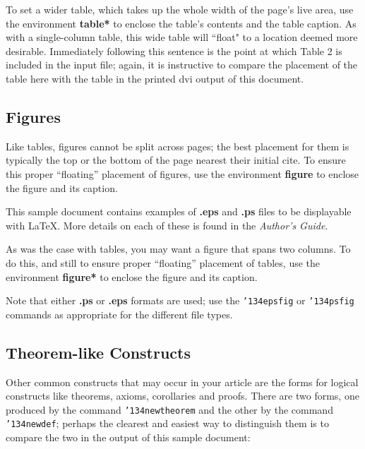 \documentclass{acm_proc_article-sp}
\begin{document}
To set a wider table, which takes up the whole width of
the page's live area, use the environment
\textbf{table*} to enclose the table's contents and
the table caption.  As with a single-column table, this wide
table will ``float" to a location deemed more desirable.
Immediately following this sentence is the point at which
Table 2 is included in the input file; again, it is
instructive to compare the placement of the
table here with the table in the printed dvi
output of this document.

\subsection{Figures}
Like tables, figures cannot be split across pages; the
best placement for them
is typically the top or the bottom of the page nearest
their initial cite.  To ensure this proper ``floating'' placement
of figures, use the environment
\textbf{figure} to enclose the figure and its caption.

This sample document contains examples of \textbf{.eps}
and \textbf{.ps} files to be displayable with \LaTeX.  More
details on each of these is found in the \textit{Author's Guide}.

%
%


As was the case with tables, you may want a figure
that spans two columns.  To do this, and still to
ensure proper ``floating'' placement of tables, use the environment
\textbf{figure*} to enclose the figure and its caption.

Note that either {\textbf{.ps}} or {\textbf{.eps}} formats are
used; use
the \texttt{{\char'134}epsfig} or \texttt{{\char'134}psfig}
commands as appropriate for the different file types.

\subsection{Theorem-like Constructs}
Other common constructs that may occur in your article are
the forms for logical constructs like theorems, axioms,
corollaries and proofs.  There are
two forms, one produced by the
command \texttt{{\char'134}newtheorem} and the
other by the command \texttt{{\char'134}newdef}; perhaps
the clearest and easiest way to distinguish them is
to compare the two in the output of this sample document:
\end{document}

